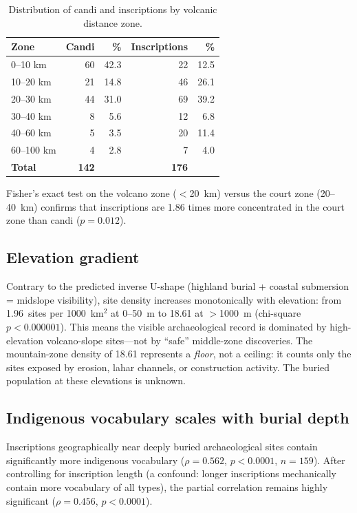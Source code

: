 \documentclass[12pt]{article}
\begin{document}
\begin{table}[htbp]
\centering
\caption{Distribution of candi and inscriptions by volcanic distance zone.}
\label{tab:zones}
\begin{tabular}{lrrrr}
\toprule
\textbf{Zone} & \textbf{Candi} & \textbf{\%} & \textbf{Inscriptions} & \textbf{\%} \\
\midrule
0--10 km   & 60 & 42.3 & 22 & 12.5 \\
10--20 km  & 21 & 14.8 & 46 & 26.1 \\
20--30 km  & 44 & 31.0 & 69 & 39.2 \\
30--40 km  &  8 &  5.6 & 12 &  6.8 \\
40--60 km  &  5 &  3.5 & 20 & 11.4 \\
60--100 km &  4 &  2.8 &  7 &  4.0 \\
\midrule
\textbf{Total} & \textbf{142} & & \textbf{176} & \\
\bottomrule
\end{tabular}
\end{table}

Fisher's exact test on the volcano zone ($<$20~km) versus the court zone (20--40~km) confirms that inscriptions are 1.86 times more concentrated in the court zone than candi ($p = 0.012$).

\subsection{Elevation gradient}

Contrary to the predicted inverse U-shape (highland burial + coastal submersion = midslope visibility), site density increases monotonically with elevation: from 1.96~sites per 1000~km$^2$ at 0--50~m to 18.61 at $>$1000~m (chi-square $p < 0.000001$).
This means the visible archaeological record is dominated by high-elevation volcano-slope sites---not by ``safe'' middle-zone discoveries.
The mountain-zone density of 18.61 represents a \emph{floor}, not a ceiling: it counts only the sites exposed by erosion, lahar channels, or construction activity.
The buried population at these elevations is unknown.

\subsection{Indigenous vocabulary scales with burial depth}

Inscriptions geographically near deeply buried archaeological sites contain significantly more indigenous vocabulary ($\rho = 0.562$, $p < 0.0001$, $n = 159$).
After controlling for inscription length (a confound: longer inscriptions mechanically contain more vocabulary of all types), the partial correlation remains highly significant ($\rho = 0.456$, $p < 0.0001$).
\end{document}
